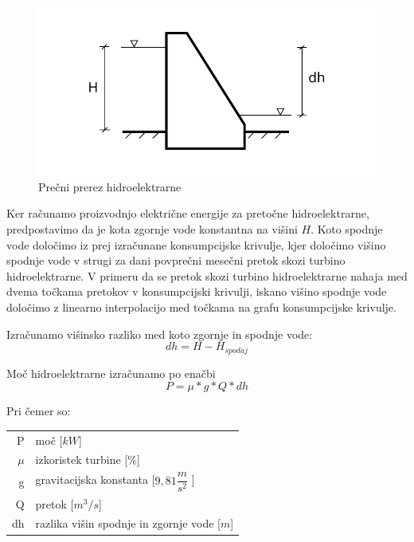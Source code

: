 \begin{figure}[ht!]
	\begin{centering}
		\includegraphics{slike/electricityProduction/powerplant_crossSection.pdf}
		\caption{Prečni prerez hidroelektrarne}
	\end{centering}
\end{figure}

Ker računamo proizvodnjo električne energije za pretočne hidroelektrarne, predpostavimo da je kota zgornje vode konstantna na višini $H$. Koto spodnje vode določimo iz prej izračunane konsumpcijske krivulje, kjer določimo višino spodnje vode v strugi za dani povprečni mesečni pretok skozi turbino hidroelektrarne. V primeru da se pretok skozi turbino hidroelektrarne nahaja med dvema točkama pretokov v konsumpcijski krivulji, iskano višino spodnje vode določimo z linearno interpolacijo med točkama na grafu konsumpcijske krivulje.

Izračunamo višinsko razliko med koto zgornje in spodnje vode:
\begin{equation}
dh = H - H_{spodaj}
\end{equation}

Moč hidroelektrarne izračunamo po enačbi
\begin{equation}
P = \mu * g * Q * dh
\end{equation}

Pri čemer so:
\begin{table}[htb!]
	\begin{tabular}{r|p{10cm}}
		P & moč [$kW$]\\
		$\mu$ & izkoristek turbine [\%]\\
		g & gravitacijska konstanta [$9,81\dfrac{m}{s^{2}}$ ] \\
		Q & pretok [$m^{3}/s$]\\
		dh & razlika višin spodnje in zgornje vode [$m$]
	\end{tabular}
\end{table}



